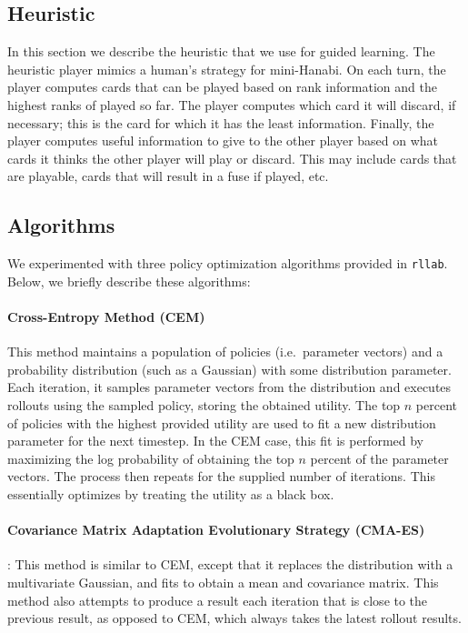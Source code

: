 \subsection{Heuristic}

In this section we describe the heuristic that we use for guided learning.  The
heuristic player mimics a human's strategy for mini-Hanabi. On each turn, the
player computes cards that can be played based on rank information and the
highest ranks of played so far. The player computes which card it will discard,
if necessary; this is the card for which it has the least information.
Finally, the player computes useful information to give to the other player
based on what cards it thinks the other player will play or discard. This may
include cards that are playable, cards that will result in a fuse if played,
etc.

\subsection{Algorithms}
We experimented with three policy optimization algorithms provided in
\texttt{rllab}. Below, we briefly describe these algorithms:

\paragraph{Cross-Entropy Method (CEM)~\cite{rubinstein2013cross,
policyoptimizationNIPS2016}}
This method maintains a population of policies (i.e.\ parameter vectors) and a
probability distribution (such as a Gaussian) with some distribution parameter.
Each iteration, it samples parameter vectors from the distribution and executes
rollouts using the sampled policy, storing the obtained utility.  The top $n$
percent of policies with the highest provided utility are used to fit a new
distribution parameter for the next timestep. In the CEM case, this fit is
performed by maximizing the log probability of obtaining the top $n$ percent of
the parameter vectors. The process then repeats for the supplied number of
iterations. This essentially optimizes by treating the utility as a black box.

\paragraph{Covariance Matrix Adaptation Evolutionary Strategy
(CMA-ES)~\cite{cmaes, policyoptimizationNIPS2016}}:
This method is similar to CEM, except that it replaces the distribution with a
multivariate Gaussian, and fits to obtain a mean and covariance matrix.  This
method also attempts to produce a result each iteration that is close to the
previous result, as opposed to CEM, which always takes the latest rollout
results.

